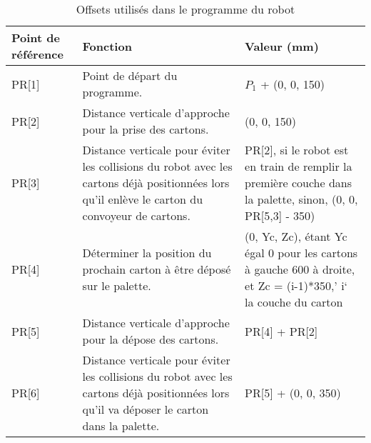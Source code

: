 \begin{table}[H]
	\renewcommand{\tabularxcolumn}[1]{>{\small}m{#1}}
	\caption{Offsets utilisés dans le programme du robot}
		\label{tab:offsets}
		\begin{tabularx}{\textwidth}{>{\centering\arraybackslash}X|>{\centering\arraybackslash}X|>{\centering\arraybackslash}X}			
			\textbf{Point de référence}&
			\textbf{Fonction}&
			\textbf{Valeur (mm)}\\
			\hline			
			PR[1]&
			Point de départ du programme.&
			$P_1$ + (0, 0, 150)\\
			\hline			
			PR[2]&
			Distance verticale d’approche pour la prise des cartons.&
			(0, 0, 150)\\			
			\hline
			PR[3]&
			Distance verticale pour éviter les collisions du robot avec les cartons déjà positionnées lors qu’il enlève le carton du convoyeur de cartons.     &
			PR[2], si le robot est en train de remplir la première couche dans la palette,  sinon, (0, 0, PR[5,3] - 350)\\
			\hline			
			PR[4]&
			Déterminer la position du prochain carton à être déposé sur le palette.&
			(0, Yc, Zc), étant Yc égal 0 pour les cartons à gauche 600 à droite, et Zc = (i-1)*350,’ i‘ la couche du carton\\
			\hline
			PR[5]&
			Distance verticale d’approche pour la dépose des cartons.&
			PR[4] + PR[2]\\
			\hline
			PR[6]&
			Distance verticale pour éviter les collisions du robot avec les cartons déjà positionnées lors qu’il va déposer le carton dans la palette.   &
			PR[5] + (0, 0, 350)\\			
		\end{tabularx}
\end{table}

